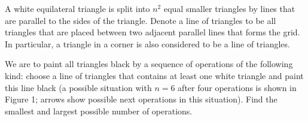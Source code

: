 A white equilateral triangle is split into $n^2$ equal smaller triangles by lines that are parallel to the sides of the triangle. Denote a line of triangles to be all triangles that are placed between two adjacent parallel lines that forms the grid. In particular, a triangle in a corner is also considered to be a line of triangles.

We are to paint all triangles black by a sequence of operations of the following kind: choose a line of triangles that contains at least one white triangle and paint this line black (a possible situation with $n=6$ after four operations is shown in Figure 1; arrows show possible next operations in this situation). Find the smallest and largest possible number of operations.
